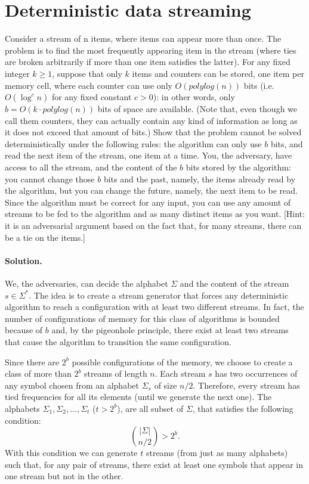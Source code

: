 \section{Deterministic data streaming}

Consider a stream of n items, where items can appear more than once. The problem is to find the most frequently appearing item in the stream (where ties are broken arbitrarily if more than one item satisfies the latter). For any fixed integer $k \geq 1$, suppose that only $k$ items and counters can be stored, one item per memory cell, where each counter can use only $O(polylog(n))$ bits (i.e. $O(\log^c n)$ for any fixed constant $c > 0$): in other words, only $b = O(k\cdot polylog(n))$ bits of space are available. (Note that, even though we call them counters, they can actually contain any kind of information as long as it does not exceed that amount of bits.)
Show that the problem cannot be solved deterministically under the following rules: the algorithm can only use $b$ bits, and read the next item of the stream, one item at a time. You, the adversary, have access to all the stream, and the content of the $b$ bits stored by the algorithm: you cannot change those $b$ bits and the past, namely, the items already read by the algorithm, but you can change the future, namely, the next item to be read. Since the algorithm must be correct for any input, you can use any amount of streams to be fed to the algorithm and as many distinct items as you want. [Hint: it is an adversarial argument based on the fact that, for many streams, there can be a tie on the items.]

\vspace{0.5cm}
\paragraph{Solution.} We, the adversaries, can decide the alphabet $\Sigma$ and the content of the stream $s\in \Sigma^*$. The idea is to create a stream generator that forces any deterministic algorithm to reach a configuration with at least two different streams. In fact, the number of configurations of memory for this class of algorithms is bounded because of $b$ and, by the pigeonhole principle, there exist at least two streams that cause the algorithm to transition the same configuration.

Since there are $2^b$ possible configurations of the memory, we choose to create a class of more than $2^b$ streams of length $n$. Each stream $s$ has two occurrences of any symbol chosen from an alphabet $\Sigma_s$ of size $n/2$. Therefore, every stream has tied frequencies for all its elements (until we generate the next one). The alphabets $\Sigma_1, \Sigma_2, \dots, \Sigma_{t}$ ($t > 2^b$), are all subset of $\Sigma$, that satisfies the following condition:
$${|\Sigma| \choose n/2} > 2^b.$$
With this condition we can generate $t$ streams (from just as many alphabets) such that, for any pair of streams, there exist at least one symbols that appear in one stream but not in the other.

